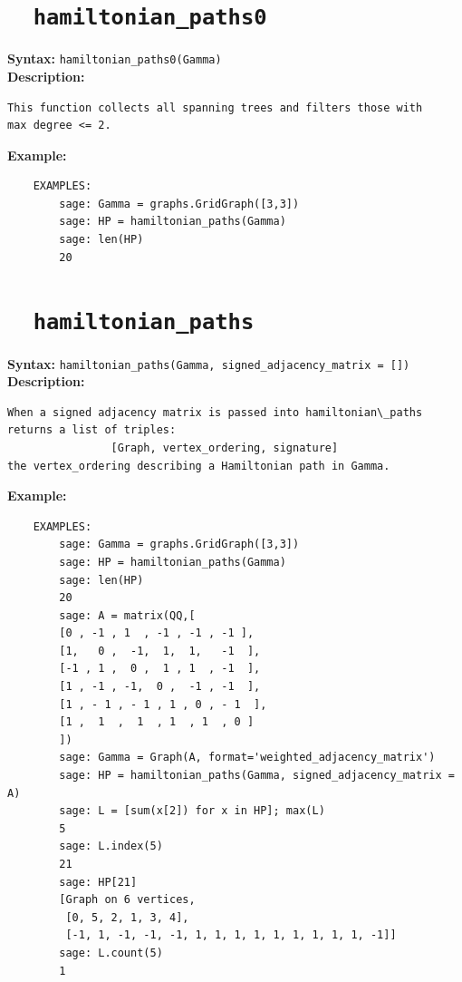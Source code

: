 \documentclass{article}
\begin{document}
\section{\tt \ \ hamiltonian\_paths0}

\textbf{Syntax:} \verb}hamiltonian_paths0(Gamma)}\\

\textbf{Description:}
\begin{verbatim}
This function collects all spanning trees and filters those with
max degree <= 2.
\end{verbatim}

\textbf{Example:}
\begin{verbatim}
    EXAMPLES:
        sage: Gamma = graphs.GridGraph([3,3])
        sage: HP = hamiltonian_paths(Gamma)
        sage: len(HP)
        20
\end{verbatim}

\section{\tt \ \ hamiltonian\_paths}

\textbf{Syntax:} \verb}hamiltonian_paths(Gamma, signed_adjacency_matrix = [])}\\

\textbf{Description:}
\begin{verbatim}
When a signed adjacency matrix is passed into hamiltonian\_paths
returns a list of triples:
                [Graph, vertex_ordering, signature]
the vertex_ordering describing a Hamiltonian path in Gamma.
\end{verbatim}

\textbf{Example:}
\begin{verbatim}
    EXAMPLES:
        sage: Gamma = graphs.GridGraph([3,3])
        sage: HP = hamiltonian_paths(Gamma)
        sage: len(HP)
        20
        sage: A = matrix(QQ,[
        [0 , -1 , 1  , -1 , -1 , -1 ],
        [1,   0 ,  -1,  1,  1,   -1  ],
        [-1 , 1 ,  0 ,  1 , 1  , -1  ],
        [1 , -1 , -1,  0 ,  -1 , -1  ],
        [1 , - 1 , - 1 , 1 , 0 , - 1  ],
        [1 ,  1  ,  1  , 1  , 1  , 0 ]
        ])
        sage: Gamma = Graph(A, format='weighted_adjacency_matrix')
        sage: HP = hamiltonian_paths(Gamma, signed_adjacency_matrix = A)
        sage: L = [sum(x[2]) for x in HP]; max(L)
        5
        sage: L.index(5)
        21
        sage: HP[21]                                 
        [Graph on 6 vertices,
         [0, 5, 2, 1, 3, 4],
         [-1, 1, -1, -1, -1, 1, 1, 1, 1, 1, 1, 1, 1, 1, -1]]
        sage: L.count(5)
        1
\end{verbatim}
\end{document}
